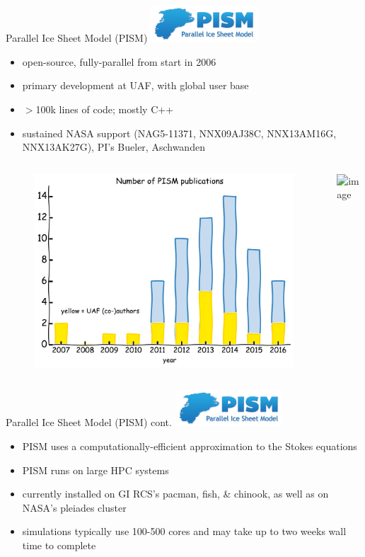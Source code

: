 \documentclass[hide notes,intlimits]{beamer}
\begin{document}
\begin{frame}{Parallel Ice Sheet Model (PISM)}
  \includegraphics[width=4cm]{pism-logo}
  \begin{itemize}
  \item open-source, fully-parallel from start in 2006
  \item primary development at UAF, with global user base
  \item $>$100k lines of code; mostly C++
  \item sustained NASA support \tiny (NAG5-11371, NNX09AJ38C, NNX13AM16G, NNX13AK27G), PI's Bueler, Aschwanden
  \end{itemize}
  \begin{columns}
    \column[c]{4.75cm}
    \begin{figure}
      \includegraphics[width=\textwidth]{pism-uaf-publications}
    \end{figure}
    \column[c]{6.25cm}
    \includegraphics<1>[width=\textwidth]{pism-users}
  \end{columns}
\end{frame}

\begin{frame}{Parallel Ice Sheet Model (PISM) cont.}
  \includegraphics[width=4cm]{pism-logo}
  \begin{itemize}
  \item PISM uses a computationally-efficient approximation to the Stokes equations
  \item PISM runs on large HPC systems
  \item currently installed on GI RCS's pacman, fish, \& chinook, as well as on NASA's pleiades cluster
  \item simulations typically use 100-500 cores and may take up to two weeks wall time to complete
  \end{itemize}
\end{frame}
\end{document}
